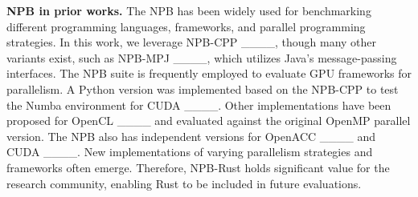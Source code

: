 \textbf{NPB in prior works.} The NPB has been widely used for benchmarking different programming languages, frameworks, and parallel programming strategies. In this work, we leverage NPB-CPP ____, though many other variants exist, such as NPB-MPJ ____, which utilizes Java's message-passing interfaces. The NPB suite is frequently employed to evaluate GPU frameworks for parallelism. A Python version was implemented based on the NPB-CPP to test the Numba environment for CUDA ____. Other implementations have been proposed for OpenCL ____ and evaluated against the original OpenMP parallel version. The NPB also has independent versions for OpenACC ____ and CUDA ____. New implementations of varying parallelism strategies and frameworks often emerge. Therefore, NPB-Rust holds significant value for the research community, enabling Rust to be included in future evaluations.










